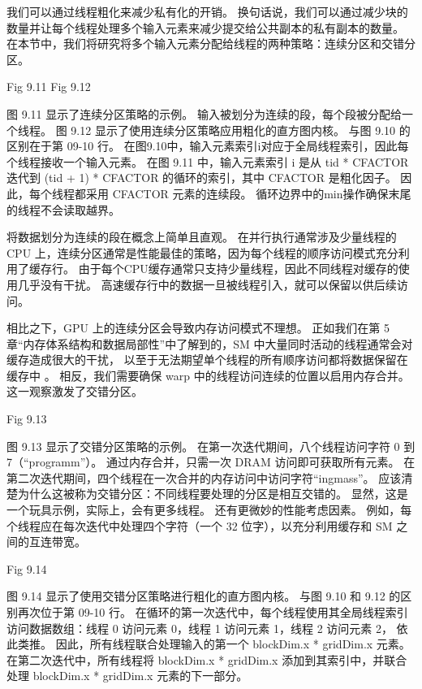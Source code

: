 我们可以通过线程粗化来减少私有化的开销。 
换句话说，我们可以通过减少块的数量并让每个线程处理多个输入元素来减少提交给公共副本的私有副本的数量。 
在本节中，我们将研究将多个输入元素分配给线程的两种策略：连续分区和交错分区。

{\color{red} Fig 9.11}
{\color{red} Fig 9.12}

图 9.11 显示了连续分区策略的示例。 输入被划分为连续的段，每个段被分配给一个线程。 
图 9.12 显示了使用连续分区策略应用粗化的直方图内核。 与图 9.10 的区别在于第 09-10 行。 
在图9.10中，输入元素索引i对应于全局线程索引，因此每个线程接收一个输入元素。 
在图 9.11 中，输入元素索引 i 是从 tid * CFACTOR 迭代到 (tid + 1) * CFACTOR 的循环的索引，其中 CFACTOR 是粗化因子。 
因此，每个线程都采用 CFACTOR 元素的连续段。 循环边界中的min操作确保末尾的线程不会读取越界。

将数据划分为连续的段在概念上简单且直观。 
在并行执行通常涉及少量线程的 CPU 上，连续分区通常是性能最佳的策略，因为每个线程的顺序访问模式充分利用了缓存行。 
由于每个CPU缓存通常只支持少量线程，因此不同线程对缓存的使用几乎没有干扰。 
高速缓存行中的数据一旦被线程引入，就可以保留以供后续访问。

相比之下，GPU 上的连续分区会导致内存访问模式不理想。 
正如我们在第 5 章“内存体系结构和数据局部性”中了解到的，SM 中大量同时活动的线程通常会对缓存造成很大的干扰，
以至于无法期望单个线程的所有顺序访问都将数据保留在缓存中 。 
相反，我们需要确保 warp 中的线程访问连续的位置以启用内存合并。 这一观察激发了交错分区。

{\color{red} Fig 9.13}

图 9.13 显示了交错分区策略的示例。 在第一次迭代期间，八个线程访问字符 0 到 7（“programm”）。 
通过内存合并，只需一次 DRAM 访问即可获取所有元素。 在第二次迭代期间，四个线程在一次合并的内存访问中访问字符“ingmass”。 
应该清楚为什么这被称为交错分区：不同线程要处理的分区是相互交错的。 显然，这是一个玩具示例，实际上，会有更多线程。 
还有更微妙的性能考虑因素。 例如，每个线程应在每次迭代中处理四个字符（一个 32 位字），以充分利用缓存和 SM 之间的互连带宽。

{\color{red} Fig 9.14}

图 9.14 显示了使用交错分区策略进行粗化的直方图内核。 与图 9.10 和 9.12 的区别再次位于第 09-10 行。 
在循环的第一次迭代中，每个线程使用其全局线程索引访问数据数组：线程 0 访问元素 0，线程 1 访问元素 1，线程 2 访问元素 2，
依此类推。 因此，所有线程联合处理输入的第一个 blockDim.x * gridDim.x 元素。 
在第二次迭代中，所有线程将 blockDim.x * gridDim.x 添加到其索引中，并联合处理 blockDim.x * gridDim.x 元素的下一部分。

